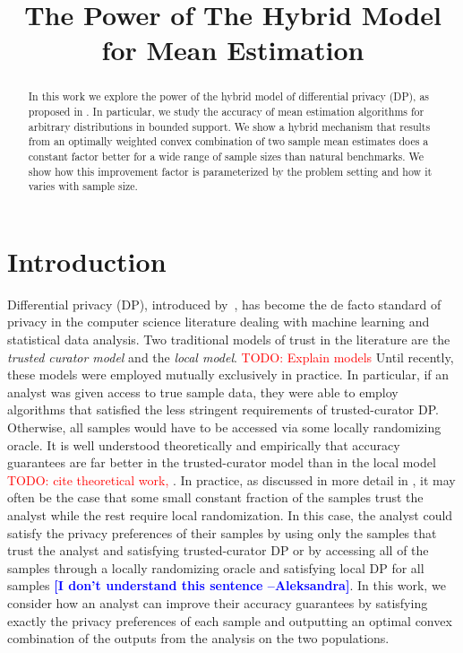 \documentclass{article}
\title{The Power of The Hybrid Model for Mean Estimation}
\newcommand{\ak}[1]{\textcolor{blue}{\bf\small [#1 --Aleksandra]}}
\newcommand\TODO[1]{\textcolor{red}{TODO: {#1}}}
\theoremstyle{plain}
\begin{document}
\maketitle

\begin{abstract}
In this work we explore the power of the hybrid model of differential privacy (DP), as proposed in \cite{blender}. In particular, we study the accuracy of mean estimation algorithms for arbitrary distributions in bounded support. We show a hybrid mechanism that results from an optimally weighted convex combination of two sample mean estimates does a constant factor better for a wide range of sample sizes than natural benchmarks. We show how this improvement factor is parameterized by the problem setting and how it varies with sample size. 
\end{abstract}

\section{Introduction}

Differential privacy (DP), introduced by~\cite{dmns06}, has become the de facto standard of privacy in the computer science literature dealing with machine learning and statistical data analysis. Two traditional models of trust in the literature are the \textit{trusted curator model} and the \textit{local model}. \TODO{Explain models} Until recently, these models were employed mutually exclusively in practice. In particular, if an analyst was given access to true sample data, they were able to employ algorithms that satisfied the less stringent requirements of trusted-curator DP. Otherwise, all samples would have to be accessed via some locally randomizing oracle. It is well understood theoretically and empirically that accuracy guarantees are far better in the trusted-curator model than in the local model \TODO{cite theoretical work, \cite{bittau2017prochlo}}. In practice, as discussed in more detail in \cite{blender}, it may often be the case that some small constant fraction of the samples trust the analyst while the rest require local randomization. In this case, the analyst could satisfy the privacy preferences of their samples by using only the samples that trust the analyst and satisfying trusted-curator DP or by accessing all of the samples through a locally randomizing oracle and satisfying local DP for all samples \ak{I don't understand this sentence}. In this work, we consider how an analyst can improve their accuracy guarantees by satisfying exactly the privacy preferences of each sample and outputting an optimal convex combination of the outputs from the analysis on the two populations. 
\end{document}
